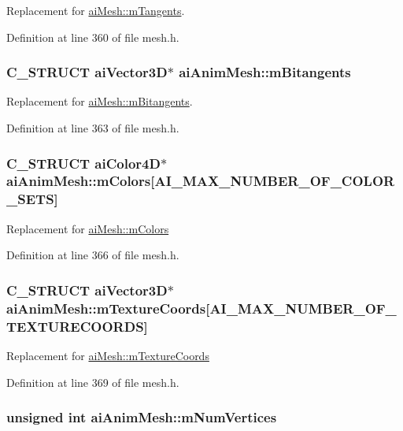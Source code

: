 Replacement for \hyperlink{structai_mesh_f367ff78bd69f3e83d7edc8ad67dc5df}{aiMesh::mTangents}. 

Definition at line 360 of file mesh.h.\hypertarget{structai_anim_mesh_7d60acf4d2b4b59dcc6c88956bfae85f}{
\subsubsection[mBitangents]{\setlength{\rightskip}{0pt plus 5cm}C\_\-STRUCT aiVector3D$\ast$ {\bf aiAnimMesh::mBitangents}}}
\label{structai_anim_mesh_7d60acf4d2b4b59dcc6c88956bfae85f}


Replacement for \hyperlink{structai_mesh_b2a81bfe1731f01271ebab274a8f01c4}{aiMesh::mBitangents}. 

Definition at line 363 of file mesh.h.\hypertarget{structai_anim_mesh_4f062d9fac71c6b367fdf0f8638e1ca5}{
\subsubsection[mColors]{\setlength{\rightskip}{0pt plus 5cm}C\_\-STRUCT aiColor4D$\ast$ {\bf aiAnimMesh::mColors}\mbox{[}AI\_\-MAX\_\-NUMBER\_\-OF\_\-COLOR\_\-SETS\mbox{]}}}
\label{structai_anim_mesh_4f062d9fac71c6b367fdf0f8638e1ca5}


Replacement for \hyperlink{structai_mesh_d9215f67bd0c2277b10775a8adb66b96}{aiMesh::mColors} 

Definition at line 366 of file mesh.h.\hypertarget{structai_anim_mesh_d24a0451adeb845a53eb2351b9462e0a}{
\subsubsection[mTextureCoords]{\setlength{\rightskip}{0pt plus 5cm}C\_\-STRUCT aiVector3D$\ast$ {\bf aiAnimMesh::mTextureCoords}\mbox{[}AI\_\-MAX\_\-NUMBER\_\-OF\_\-TEXTURECOORDS\mbox{]}}}
\label{structai_anim_mesh_d24a0451adeb845a53eb2351b9462e0a}


Replacement for \hyperlink{structai_mesh_4a50b11d00ef50f419c75cab0f6bddd6}{aiMesh::mTextureCoords} 

Definition at line 369 of file mesh.h.\hypertarget{structai_anim_mesh_6bb0d45317a1bbea7f2b7f8191d0c436}{
\subsubsection[mNumVertices]{\setlength{\rightskip}{0pt plus 5cm}unsigned int {\bf aiAnimMesh::mNumVertices}}}
\label{structai_anim_mesh_6bb0d45317a1bbea7f2b7f8191d0c436}


